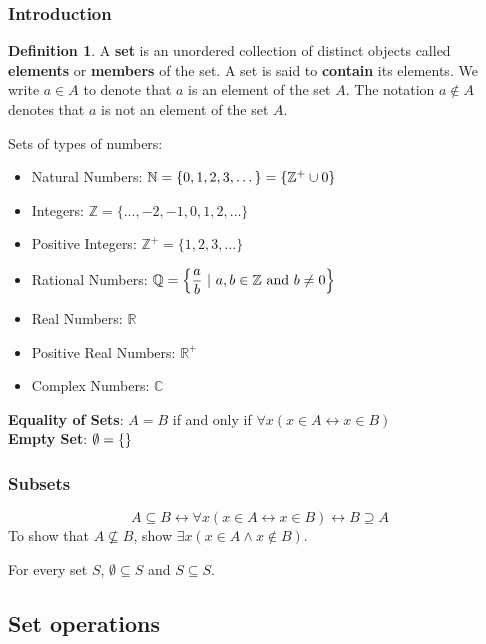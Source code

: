 \documentclass[article, 11pt]{article}
\theoremstyle{definition}
\newtheorem{definition}{Definition}[section]
\newcommand{\lra}{\leftrightarrow} %
\newcommand{\df}{\displaystyle\frac} %
\DeclarePairedDelimiter\set{\{}{\}}
\newcommand{\unite}{\cup}
\newcommand{\reals}{\mathbb{R}}
\newcommand{\ints}{\mathbb{Z}}
\newcommand{\posints}{\mathbb{Z}^+}
\newcommand{\nats}{\mathbb{N}} %
\newcommand{\rats}{\mathbb{Q}}
\newcommand{\comps}{\mathbb{C}}
\begin{document}
    \subsubsection{Introduction}
    \begin{definition}
        A \textbf{set} is an unordered collection of distinct objects called \textbf{elements} or \textbf{members} of the set. A set is said to \textbf{contain} its elements. We write $a \in A$ to denote that $a$ is an element of the set $A$. The notation $a \notin A$ denotes that $a$ is not an element of the set $A$.   
    \end{definition}

    Sets of types of numbers:
    \begin{itemize}
        \item Natural Numbers: $\nats = \{0, 1, 2, 3, \dots\} = \set*{\posints \unite 0}$
        \item Integers: $\ints = \{..., -2, -1, 0, 1, 2, \dots\}$
        \item Positive Integers: $\ints^+ = \{1, 2, 3, \dots\}$
        \item Rational Numbers: $\rats = \set*{\df{a}{b} \ | \ a, b \in \ints \text{ and } b \neq 0}$
        \item Real Numbers: $\reals$
        \item Positive Real Numbers: $\reals^+$
        \item Complex Numbers: $\comps$
    \end{itemize}

    \textbf{Equality of Sets}: $A=B$ if and only if $\forall x (x \in A \lra x \in B)$
    \\

    \textbf{Empty Set}: $\emptyset = \set*{}$
    \subsubsection{Subsets}
    \begin{equation*}
        A \subseteq B \lra \forall x (x \in A \lra x \in B) \lra B \supseteq A
    \end{equation*}
    To show that $A \not\subseteq B$, show $\exists x (x \in A \land x \not\in B)$.
    
    For every set $S$, $\emptyset \subseteq S$ and $S \subseteq S$.
    \subsection{Set operations}
\end{document}
